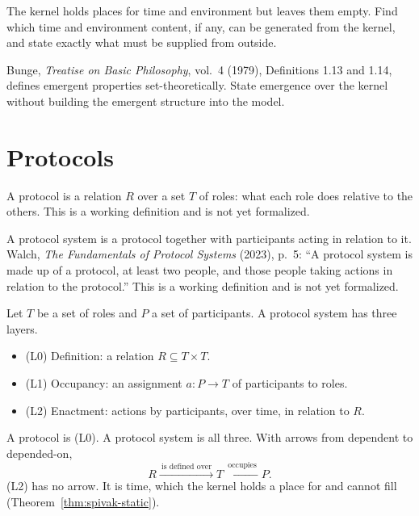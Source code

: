 \begin{problem}
  \label{prob:time-environment}
  The kernel holds places for time and environment but leaves them empty.
  Find which time and environment content, if any, can be generated from the
  kernel, and state exactly what must be supplied from outside.
\end{problem}

\begin{problem}[Emergence]
  \label{prob:emergence}
  Bunge, \emph{Treatise on Basic Philosophy}, vol.~4 (1979), Definitions
  1.13 and 1.14, defines emergent properties set-theoretically. State
  emergence over the kernel without building the emergent structure into
  the model.
\end{problem}

\chapter{Protocols}

\begin{definition}[Protocol]
  \label{def:protocol}
  A protocol is a relation $R$ over a set $T$ of roles: what each role does
  relative to the others. This is a working definition and is not yet
  formalized.
\end{definition}

\begin{definition}
  \label{def:protocol-system}
  A protocol system is a protocol together with participants acting in
  relation to it. Walch, \emph{The Fundamentals of Protocol Systems} (2023),
  p.~5: ``A protocol system is made up of a protocol, at least two people,
  and those people taking actions in relation to the protocol.'' This is a
  working definition and is not yet formalized.
\end{definition}

\begin{definition}[Layers]
  \label{def:layers}
  Let $T$ be a set of roles and $P$ a set of participants. A protocol system
  has three layers.
  \begin{itemize}
    \item (L0) Definition: a relation $R \subseteq T \times T$.
    \item (L1) Occupancy: an assignment $a \colon P \to T$ of participants
      to roles.
    \item (L2) Enactment: actions by participants, over time, in relation
      to $R$.
  \end{itemize}
  A protocol is (L0). A protocol system is all three. With arrows from
  dependent to depended-on,
  \[
    R \xrightarrow{\ \text{is defined over}\ } T
      \xleftarrow{\ \text{occupies}\ } P .
  \]
  (L2) has no arrow. It is time, which the kernel holds a place for and
  cannot fill (Theorem~\ref{thm:spivak-static}).
\end{definition}

